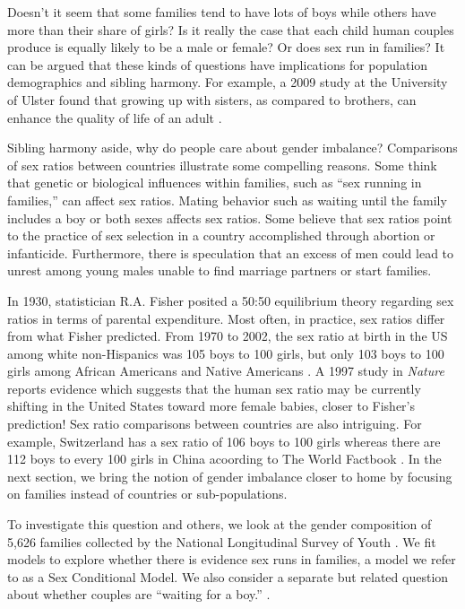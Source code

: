 \documentclass[
]{krantz}
\begin{document}
Doesn't it seem that some families tend to have lots of boys while others have more than their share of girls? Is it really the case that each child human couples produce is equally likely to be a male or female? Or does sex run in families? It can be argued that these kinds of questions have implications for population demographics and sibling harmony. For example, a 2009 study at the University of Ulster found that growing up with sisters, as compared to brothers, can enhance the quality of life of an adult \citep{BBCNEWS1995}.

Sibling harmony aside, why do people care about gender imbalance? Comparisons of sex ratios between countries illustrate some compelling reasons. Some think that genetic or biological influences within families, such as ``sex running in families,'' can affect sex ratios. Mating behavior such as waiting until the family includes a boy or both sexes affects sex ratios. Some believe that sex ratios point to the practice of sex selection in a country accomplished through abortion or infanticide. Furthermore, there is speculation that an excess of men could lead to unrest among young males unable to find marriage partners or start families.

In 1930, statistician R.A. Fisher posited a 50:50 equilibrium theory regarding sex ratios in terms of parental expenditure. Most often, in practice, sex ratios differ from what Fisher predicted. From 1970 to 2002, the sex ratio at birth in the US among white non-Hispanics was 105 boys to 100 girls, but only 103 boys to 100 girls among African Americans and Native Americans \citep{Mathews2005}. A 1997 study in \emph{Nature} reports evidence which suggests that the human sex ratio may be currently shifting in the United States toward more female babies, closer to Fisher's prediction! \citep{Komdeur1997} Sex ratio comparisons between countries are also intriguing. For example, Switzerland has a sex ratio of 106 boys to 100 girls whereas there are 112 boys to every 100 girls in China acoording to The World Factbook \citep{CIA2013}. In the next section, we bring the notion of gender imbalance closer to home by focusing on families instead of countries or sub-populations.

To investigate this question and others, we look at the gender composition of 5,626 families collected by the National Longitudinal Survey of Youth \citep{NLSY1997}. We fit models to explore whether there is evidence sex runs in families, a model we refer to as a Sex Conditional Model. We also consider a separate but related question about whether couples are ``waiting for a boy.'' \citep{Rodgers2001}.
\end{document}
